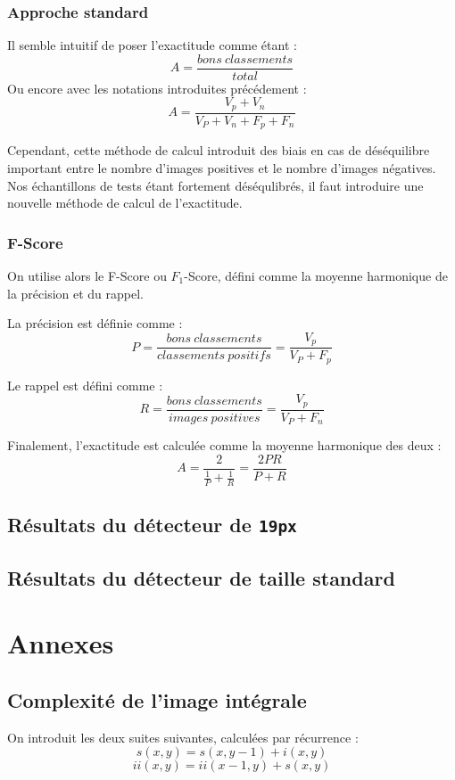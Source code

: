\documentclass[12pt,a4paper]{article}
\begin{document}
\subsubsection{Approche standard}
Il semble intuitif de poser l'exactitude comme étant :
$$ A = \frac{bons\ classements}{total} $$
Ou encore avec les notations introduites précédement :
$$\boxed{A = \frac{V_p + V_n}{V_P + V_n + F_p + F_n}}$$

Cependant, cette méthode de calcul introduit des biais en cas de déséquilibre important entre le nombre d'images positives et le nombre d'images négatives. Nos échantillons de tests étant fortement déséqulibrés, il faut introduire une nouvelle méthode de calcul de l'exactitude.

\subsubsection{F-Score}
On utilise alors le F-Score ou $F_1$-Score, défini comme la moyenne harmonique de la précision et du rappel.

La précision est définie comme :
$$ P = \frac{bons\ classements}{classements\ positifs} = \boxed{\frac{V_p}{V_P + F_p}} $$

Le rappel est défini comme :
$$ R = \frac{bons\ classements}{images\ positives} = \boxed{\frac{V_p}{V_P + F_n}} $$

Finalement, l'exactitude est calculée comme la moyenne harmonique des deux :
$$\boxed{A = \frac{2}{\frac{1}{P} + \frac{1}{R}} = \frac{2 P R}{P+R}}$$


\subsection{Résultats du détecteur de \texttt{19px}}
\subsection{Résultats du détecteur de taille standard}

\section{Annexes}
\subsection{Complexité de l'image intégrale}
On introduit les deux suites suivantes, calculées par récurrence :
$$s(x, y) = s(x, y-1) + i(x, y)$$
$$ii(x, y) = ii(x-1, y) + s(x, y)$$
\end{document}
